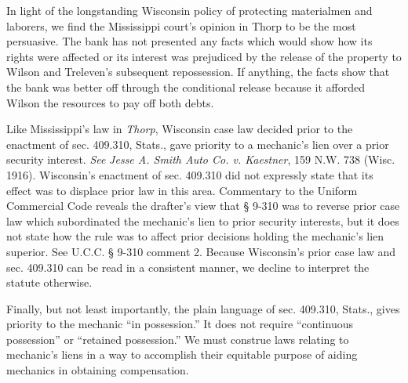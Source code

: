 In light of the longstanding Wisconsin policy of protecting materialmen and
laborers, we find the Mississippi court's opinion in Thorp to be the most
persuasive. The bank has not presented any facts which would show how its
rights were affected or its interest was prejudiced by the release of the
property to Wilson and Treleven's subsequent repossession. If anything, the
facts show that the bank was better off through the conditional release because
it afforded Wilson the resources to pay off both debts.

Like Mississippi's law in \textit{Thorp}, Wisconsin case law decided prior to
the enactment of sec. 409.310, Stats., gave priority to a mechanic's lien over
a prior security interest. \textit{See} \textit{Jesse A. Smith Auto Co. v.
Kaestner}, 159 N.W. 738 (Wisc. 1916). Wisconsin's enactment of sec. 409.310 did
not expressly state that its effect was to displace prior law in this area.
Commentary to the Uniform Commercial Code reveals the drafter's view that {\S}
9-310 was to reverse prior case law which subordinated the mechanic's lien to
prior security interests, but it does not state how the rule was to affect
prior decisions holding the mechanic's lien superior. See U.C.C. {\S} 9-310
comment 2. Because Wisconsin's prior case law and sec. 409.310 can be read in a
consistent manner, we decline to interpret the statute otherwise.

Finally, but not least importantly, the plain language of sec. 409.310, Stats.,
gives priority to the mechanic ``in possession.'' It does not require
``continuous possession'' or ``retained possession.'' We must construe laws
relating to mechanic's liens in a way to accomplish their equitable purpose of
aiding mechanics in obtaining compensation.


